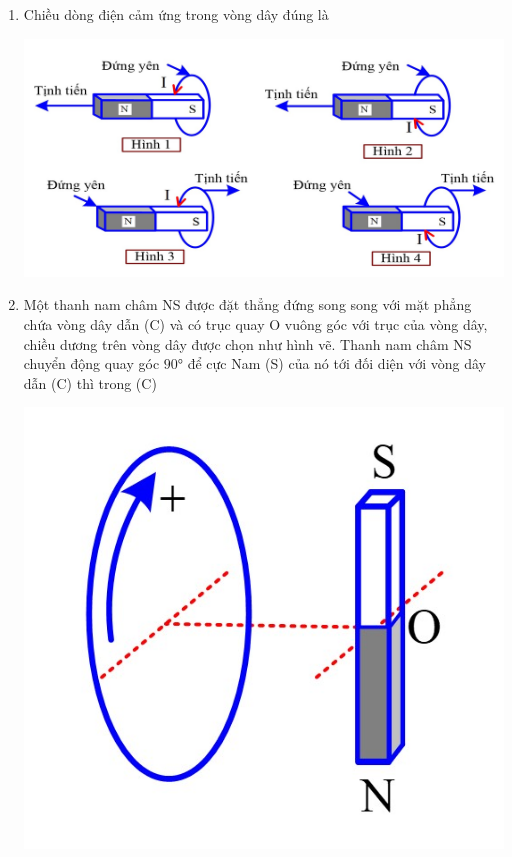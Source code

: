 \begin{enumerate}
{\begin{mcq}
		\end{mcq}
	}
	\item
	{
		Chiều dòng điện cảm ứng trong vòng dây đúng là
		\begin{center}
			\includegraphics[scale=0.4]{../figs/VN11-PH-29-P-0191-3}
		\end{center}
	}
	\item
	{
		Một thanh nam châm NS được đặt thẳng đứng song song với mặt phẳng chứa vòng dây dẫn (C) và có trục quay O vuông góc với trục của vòng dây, chiều dương trên vòng dây được chọn như hình vẽ. Thanh nam châm NS chuyển động quay góc $\ang{90}$ để cực Nam (S) của nó tới đối diện với vòng dây dẫn (C) thì trong (C)
		\begin{center}
			\includegraphics[scale=0.35]{../figs/VN11-PH-29-P-0191-4}

\end{center}}
\end{enumerate}
